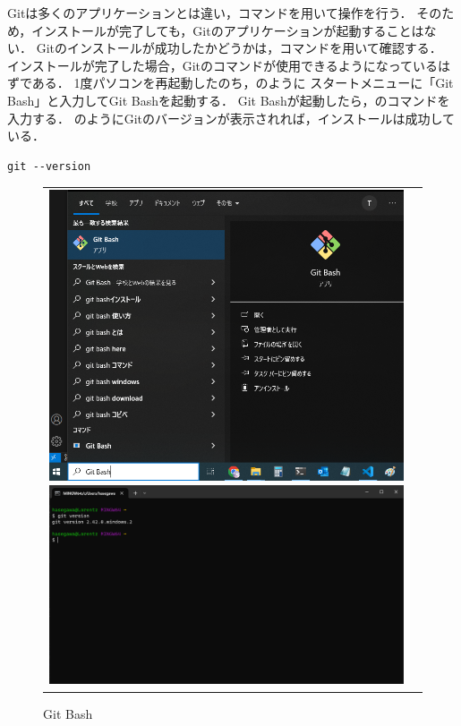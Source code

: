 Gitは多くのアプリケーションとは違い，コマンドを用いて操作を行う．
そのため，インストールが完了しても，Gitのアプリケーションが起動することはない．
Gitのインストールが成功したかどうかは，コマンドを用いて確認する．
インストールが完了した場合，Gitのコマンドが使用できるようになっているはずである．
1度パソコンを再起動したのち，のように
スタートメニューに「Git Bash」と入力してGit Bashを起動する．
Git Bashが起動したら，のコマンドを入力する．
のようにGitのバージョンが表示されれば，インストールは成功している．
\\
\begin{lstlisting}[caption=Gitのバージョン確認コマンド, label=lst:git_version]
  git --version
\end{lstlisting}

\begin{figure}[h]
  \begin{tabular}{cc}
      \begin{minipage}{.5\textwidth}
          \centering
          \includegraphics[width=1.0\linewidth]{figure/appendix/git_bash.png}
          \caption{Git Bash}
          \label{fig:git_bash} %
      \end{minipage}
      \begin{minipage}{.5\textwidth}
          \centering
          \includegraphics[width=1.0\linewidth]{figure/appendix/git_version.png}

\end{minipage}
\end{tabular}
\end{figure}
